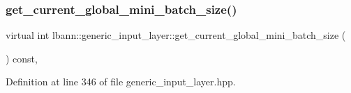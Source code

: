 \subsubsection{\texorpdfstring{get\+\_\+current\+\_\+global\+\_\+mini\+\_\+batch\+\_\+size()}{get\_current\_global\_mini\_batch\_size()}\hspace{0.1cm}{\footnotesize\ttfamily [2/2]}}
{\footnotesize\ttfamily virtual int lbann\+::generic\+\_\+input\+\_\+layer\+::get\+\_\+current\+\_\+global\+\_\+mini\+\_\+batch\+\_\+size (\begin{DoxyParamCaption}{ }\end{DoxyParamCaption}) const\hspace{0.3cm}{\ttfamily [inline]}, {\ttfamily [virtual]}}



Definition at line 346 of file generic\+\_\+input\+\_\+layer.\+hpp.


